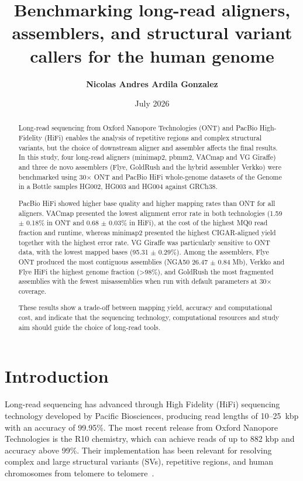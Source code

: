 \documentclass[12pt, letterpaper]{article}
\title{\textbf{Benchmarking long-read aligners, assemblers, and structural variant callers for the human genome}}
\author{\textbf{Nicolas Andres Ardila Gonzalez}}
\date{July 2026}
\begin{document}
\maketitle

\newpage

\begin{abstract}

Long-read sequencing from Oxford Nanopore Technologies (ONT) and PacBio High-Fidelity (HiFi) enables the analysis of repetitive regions and complex structural variants, but the choice of downstream aligner and assembler affects the final results. In this study, four long-read aligners (minimap2, pbmm2, VACmap and VG Giraffe) and three de novo assemblers (Flye, GoldRush and the hybrid assembler Verkko) were benchmarked using 30$\times$ ONT and PacBio HiFi whole-genome datasets of the Genome in a Bottle samples HG002, HG003 and HG004 against GRCh38.

PacBio HiFi showed higher base quality and higher mapping rates than ONT for all aligners. VACmap presented the lowest alignment error rate in both technologies (1.59 $\pm$ 0.18\% in ONT and 0.68 $\pm$ 0.03\% in HiFi), at the cost of the highest MQ0 read fraction and runtime, whereas minimap2 presented the highest CIGAR-aligned yield together with the highest error rate. VG Giraffe was particularly sensitive to ONT data, with the lowest mapped bases (95.31 $\pm$ 0.29\%). Among the assemblers, Flye ONT produced the most contiguous assemblies (NGA50 26.47 $\pm$ 0.84 Mb), Verkko and Flye HiFi the highest genome fraction (>98\%), and GoldRush the most fragmented assemblies with the fewest misassemblies when run with default parameters at 30$\times$ coverage.

These results show a trade-off between mapping yield, accuracy and computational cost, and indicate that the sequencing technology, computational resources and study aim should guide the choice of long-read tools.

\end{abstract}

\newpage

\tableofcontents

\newpage


\section{Introduction}

Long-read sequencing has advanced through High Fidelity (HiFi) sequencing technology developed by Pacific Biosciences, producing read lengths of 10--25~kbp with an accuracy of 99.95\%. The most recent release from Oxford Nanopore Technologies is the R10 chemistry, which can achieve reads of up to 882 kbp and accuracy above 99\%. Their implementation has been relevant for resolving complex and large structural variants (SVs), repetitive regions, and human chromosomes from telomere to telomere~\cite{Chang2025,Rausch2025,Mahmoud2025}.
\end{document}
